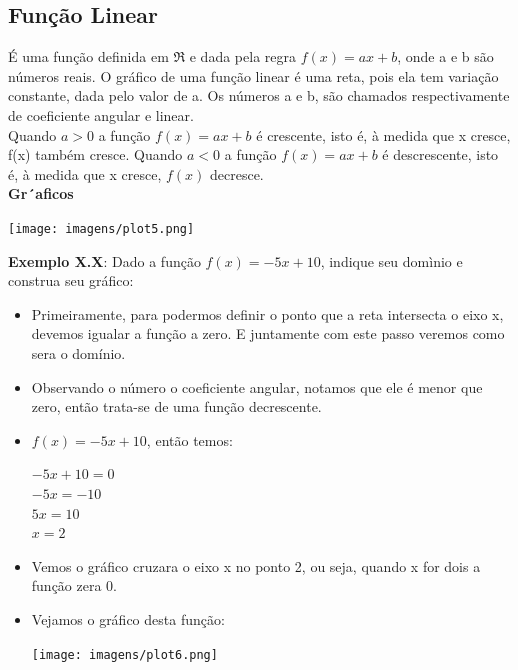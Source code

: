 \documentclass[a4paper,12pt,twoside,BCOR=10mm]{scrbook}
\begin{document}
\begin{titlepage}
\subsection{Função Linear}
É uma função definida em $\Re$ e dada pela regra $f(x) = ax + b$, onde a e b são números reais. O gráfico de uma função linear é uma reta, pois ela tem variação constante, dada pelo valor de a. Os números a e b, são chamados respectivamente de coeficiente angular e linear.\\
Quando $a > 0$ a função $f(x) = ax + b$ é crescente, isto é, à medida que x cresce, f(x) também cresce. Quando $a<0$ a função $f(x) = ax + b$ é descrescente, isto é, à medida que x cresce, $f(x)$ decresce.
\\
\textbf{Gr´aficos}
\\
\begin{center}
\texttt{[image: imagens/plot5.png]}
\end{center}
\textbf{Exemplo X.X}: Dado a função $f(x) = -5x + 10$, indique seu domìnio e construa seu gráfico:
\\
\begin{itemize}
\item Primeiramente, para podermos definir o ponto que a reta intersecta o eixo x, devemos igualar a função a zero. E juntamente com este passo veremos como sera o domínio.
\item Observando o número o coeficiente angular, notamos que ele é menor que zero, então trata-se de uma função decrescente.
\item $f(x) = -5x + 10$, então temos:
\begin{center}
$-5x + 10 = 0$\\
$-5x = -10$\\
$5x = 10$\\
$x = 2$
\end{center}
\item Vemos o gráfico cruzara o eixo x no ponto 2, ou seja, quando x for dois a função zera 0.
\item Vejamos o gráfico desta função:
\begin{center}
\texttt{[image: imagens/plot6.png]}
\end{center}
\end{itemize}

\end{titlepage}
\end{document}
